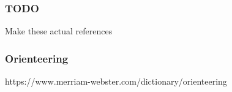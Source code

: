 \subsubsection*{TODO}
 Make these actual references
 
\subsubsection*{Orienteering}
https://www.merriam-webster.com/dictionary/orienteering